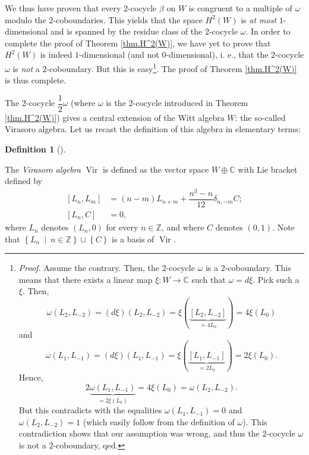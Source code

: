 \documentclass
[numbers=enddot,12pt,final,onecolumn,german,notitlepage]{scrartcl}%
\theoremstyle{definition}
\newtheorem{defi}[theo]{Definition}
\newenvironment{definition}[1][]
{\begin{defi}[#1]\begin{leftbar}}
{\end{leftbar}\end{defi}}
\begin{document}
We thus have proven that every $2$-cocycle $\beta$ on $W$ is congruent to a
multiple of $\omega$ modulo the $2$-coboundaries. This yields that the space
$H^{2}\left(  W\right)  $ is \textit{at most }$1$-dimensional and is spanned
by the residue class of the $2$-cocycle $\omega$. In order to complete the
proof of Theorem \ref{thm.H^2(W)}, we have yet to prove that $H^{2}\left(
W\right)  $ is indeed $1$-dimensional (and not $0$-dimensional), i. e., that
the $2$-cocycle $\omega$ is \textit{not} a $2$-coboundary. But this is
easy\footnote{\textit{Proof.} Assume the contrary. Then, the $2$-cocycle
$\omega$ is a $2$-coboundary. This means that there exists a linear map
$\xi:W\rightarrow\mathbb{C}$ such that $\omega=d\xi$. Pick such a $\xi$. Then,%
\[
\omega\left(  L_{2},L_{-2}\right)  =\left(  d\xi\right)  \left(  L_{2}%
,L_{-2}\right)  =\xi\left(  \underbrace{\left[  L_{2},L_{-2}\right]
}_{=4L_{0}}\right)  =4\xi\left(  L_{0}\right)
\]
and%
\[
\omega\left(  L_{1},L_{-1}\right)  =\left(  d\xi\right)  \left(  L_{1}%
,L_{-1}\right)  =\xi\left(  \underbrace{\left[  L_{1},L_{-1}\right]
}_{=2L_{0}}\right)  =2\xi\left(  L_{0}\right)  .
\]
Hence,%
\[
2\underbrace{\omega\left(  L_{1},L_{-1}\right)  }_{=2\xi\left(  L_{0}\right)
}=4\xi\left(  L_{0}\right)  =\omega\left(  L_{2},L_{-2}\right)  .
\]
But this contradicts with the equalities $\omega\left(  L_{1},L_{-1}\right)
=0$ and $\omega\left(  L_{2},L_{-2}\right)  =1$ (which easily follow from the
definition of $\omega$). This contradiction shows that our assumption was
wrong, and thus the $2$-cocycle $\omega$ is not a $2$-coboundary, qed.}. The
proof of Theorem \ref{thm.H^2(W)} is thus complete.

The $2$-cocycle $\dfrac{1}{2}\omega$ (where $\omega$ is the $2$-cocycle
introduced in Theorem \ref{thm.H^2(W)}) gives a central extension of the Witt
algebra $W$: the so-called Virasoro algebra. Let us recast the definition of
this algebra in elementary terms:

\begin{definition}
The \textit{Virasoro algebra} $\operatorname*{Vir}$ is defined as the vector
space $W\oplus\mathbb{C}$ with Lie bracket defined by%
\begin{align*}
\left[  L_{n},L_{m}\right]   &  =\left(  n-m\right)  L_{n+m}+\dfrac{n^{3}%
-n}{12}\delta_{n,-m}C;\\
\left[  L_{n},C\right]   &  =0,
\end{align*}
where $L_{n}$ denotes $\left(  L_{n},0\right)  $ for every $n\in\mathbb{Z}$,
and where $C$ denotes $\left(  0,1\right)  $. Note that $\left\{  L_{n}%
\ \mid\ n\in\mathbb{Z}\right\}  \cup\left\{  C\right\}  $ is a basis of
$\operatorname*{Vir}$.
\end{definition}
\end{document}
